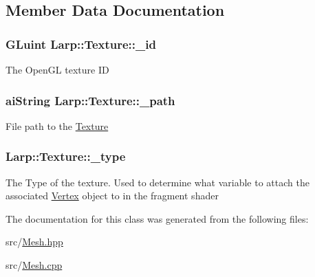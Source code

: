\subsection{Member Data Documentation}
\subsubsection[{\texorpdfstring{\+\_\+id}{_id}}]{\setlength{\rightskip}{0pt plus 5cm}G\+Luint Larp\+::\+Texture\+::\+\_\+id}\hypertarget{classLarp_1_1Texture_a123213a957b3d3ca92ea5439c12a1097}{}\label{classLarp_1_1Texture_a123213a957b3d3ca92ea5439c12a1097}
The Open\+GL texture ID 
\subsubsection[{\texorpdfstring{\+\_\+path}{_path}}]{\setlength{\rightskip}{0pt plus 5cm}ai\+String Larp\+::\+Texture\+::\+\_\+path}\hypertarget{classLarp_1_1Texture_aed77d19ec08af05131aa054df2f937b9}{}\label{classLarp_1_1Texture_aed77d19ec08af05131aa054df2f937b9}
File path to the \hyperlink{classLarp_1_1Texture}{Texture} 
\subsubsection[{\texorpdfstring{\+\_\+type}{_type}}]{ Larp\+::\+Texture\+::\+\_\+type}\hypertarget{classLarp_1_1Texture_a5db004a6f9355d7c055bbf036b5bc2f4}{}\label{classLarp_1_1Texture_a5db004a6f9355d7c055bbf036b5bc2f4}
The Type of the texture. Used to determine what variable to attach the associated \hyperlink{structLarp_1_1Vertex}{Vertex} object to in the fragment shader 

The documentation for this class was generated from the following files\+:\begin{DoxyCompactItemize}
\item 
src/\hyperlink{Mesh_8hpp}{Mesh.\+hpp}\item 
src/\hyperlink{Mesh_8cpp}{Mesh.\+cpp}\end{DoxyCompactItemize}
